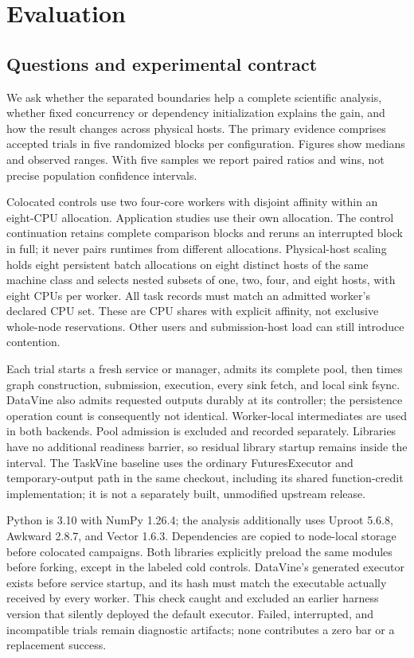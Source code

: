 \section{Evaluation}
\subsection{Questions and experimental contract}
We ask whether the separated boundaries help a complete scientific analysis,
whether fixed concurrency or dependency initialization explains the gain,
and how the result changes across physical hosts. The primary evidence comprises
\UpgradeTrials{} accepted trials in five randomized blocks per configuration.
Figures show medians and observed ranges. With five samples we report paired
ratios and wins, not precise population confidence intervals.

Colocated controls use two four-core workers with disjoint affinity within an
eight-CPU allocation. Application studies use their own
allocation. The control continuation retains complete comparison blocks and
reruns an interrupted block in full; it never pairs runtimes from different
allocations. Physical-host scaling holds eight persistent batch allocations
on eight distinct hosts of the same machine class and selects nested subsets
of one, two, four, and eight hosts, with eight CPUs per worker. All task records
must match an admitted worker's declared CPU set. These are CPU shares with
explicit affinity, not exclusive whole-node reservations. Other users and
submission-host load can still introduce contention.

Each trial starts a fresh service or manager, admits its complete pool, then
times graph construction, submission, execution, every sink fetch, and local
sink fsync. DataVine also admits requested outputs durably at its controller;
the persistence operation count is consequently not identical. Worker-local
intermediates are used in both backends. Pool admission is excluded and
recorded separately. Libraries have no additional readiness barrier, so
residual library startup remains inside the interval.
The TaskVine baseline uses the ordinary FuturesExecutor and temporary-output
path in the same checkout, including its shared function-credit implementation;
it is not a separately built, unmodified upstream release.

Python is 3.10 with NumPy 1.26.4; the analysis additionally uses Uproot 5.6.8,
Awkward 2.8.7, and Vector 1.6.3. Dependencies are copied to node-local storage
before colocated campaigns. Both libraries explicitly preload the same
modules before forking, except in the labeled cold controls. DataVine's
generated executor exists before service startup, and its hash must match
the executable actually received by every worker. This check caught and
excluded an earlier harness version that silently deployed the default
executor. Failed, interrupted, and incompatible trials remain diagnostic
artifacts; none contributes a zero bar or a replacement success.

